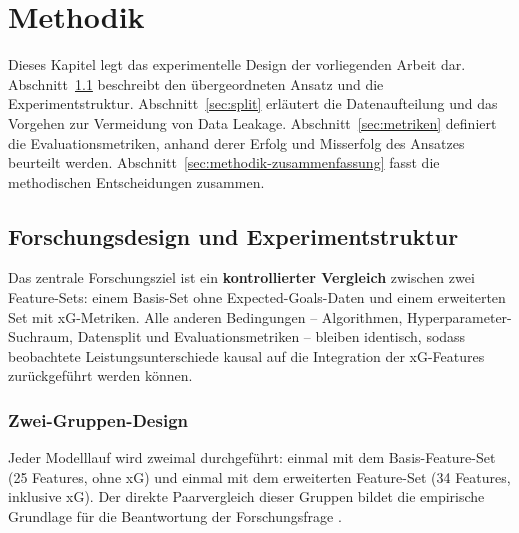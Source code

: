 
\chapter{Methodik}\label{chap:methodik}

Dieses Kapitel legt das experimentelle Design der vorliegenden Arbeit dar.
Abschnitt~\ref{sec:forschungsdesign} beschreibt den übergeordneten Ansatz
und die Experimentstruktur. Abschnitt~\ref{sec:split} erläutert die
Datenaufteilung und das Vorgehen zur Vermeidung von Data Leakage.
Abschnitt~\ref{sec:metriken} definiert die Evaluationsmetriken, anhand
derer Erfolg und Misserfolg des Ansatzes beurteilt werden.
Abschnitt~\ref{sec:methodik-zusammenfassung} fasst die methodischen
Entscheidungen zusammen.

\section{Forschungsdesign und Experimentstruktur}
\label{sec:forschungsdesign}

Das zentrale Forschungsziel ist ein \textbf{kontrollierter Vergleich} zwischen
zwei Feature-Sets: einem Basis-Set ohne Expected-Goals-Daten und einem
erweiterten Set mit xG-Metriken. Alle anderen Bedingungen -- Algorithmen,
Hyperparameter-Suchraum, Datensplit und Evaluationsmetriken -- bleiben
identisch, sodass beobachtete Leistungsunterschiede kausal auf die
Integration der xG-Features zurückgeführt werden können.

\subsection{Zwei-Gruppen-Design}

Jeder Modelllauf wird zweimal durchgeführt: einmal mit dem Basis-Feature-Set
(25 Features, ohne xG) und einmal mit dem erweiterten Feature-Set (34
Features, inklusive xG). Der direkte Paarvergleich dieser Gruppen bildet
die empirische Grundlage für die Beantwortung der Forschungsfrage
\cite{JamesEtAl2021}.

